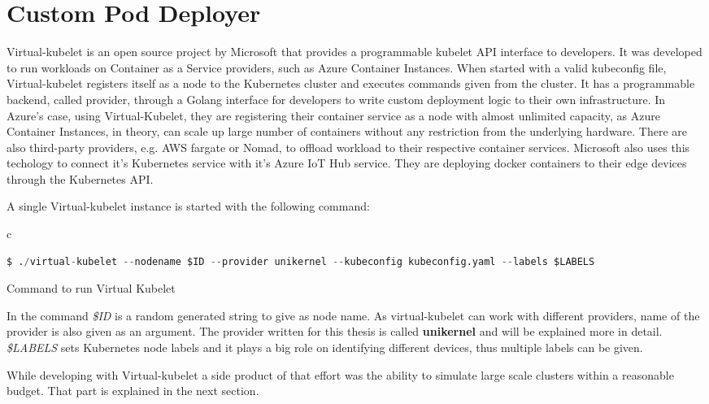 \section{Custom Pod Deployer}
Virtual-kubelet \cite{virtual} is an open source project by Microsoft that provides a programmable kubelet API interface to developers. It was developed to run workloads on Container as a Service providers, such as Azure Container Instances. When started with a valid kubeconfig file, Virtual-kubelet registers itself as a node to the Kubernetes cluster and executes commands given from the cluster. It has a programmable backend, called provider, through a Golang interface for developers to write custom deployment logic to their own infrastructure. In Azure's case, using Virtual-Kubelet, they are registering their container service as a node with almost unlimited capacity, as Azure Container Instances, in theory, can scale up large number of containers without any restriction from the underlying hardware. There are also third-party providers, e.g. AWS fargate or Nomad, to offload workload to their respective container services. Microsoft also uses this techology to connect it's Kubernetes service with it's Azure IoT Hub service.\cite{Chandra2019} They are deploying docker containers to their edge devices through the Kubernetes API. 

A single Virtual-kubelet instance is started with the following command:
\begin{code}[htpb]
  \centering
  \begin{tabular}{c}
    \begin{lstlisting}[language=python]
      $ ./virtual-kubelet --nodename $ID --provider unikernel --kubeconfig kubeconfig.yaml --labels $LABELS
      \end{lstlisting}
\end{tabular}
\caption{Command to run Virtual Kubelet}\label{lst:vkcommand}
\end{code}


In the command \textit{\$ID} is a random generated string to give as node name. As virtual-kubelet can work with different providers, name of the provider is also given as an argument. The provider written for this thesis is called \textbf{unikernel} and will be explained more in detail. \textit{\$LABELS} sets Kubernetes node labels and it plays a big role on identifying different devices, thus multiple labels can be given.

While developing with Virtual-kubelet a side product of that effort was the ability to simulate large scale clusters within a reasonable budget. That part is explained in the next section.
